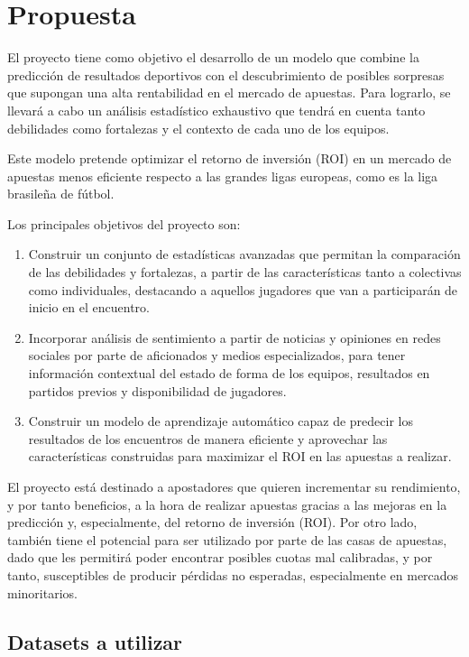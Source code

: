 \section{Propuesta}

El proyecto tiene como objetivo el desarrollo de un modelo que combine la predicción de resultados deportivos con el descubrimiento de posibles sorpresas que supongan una alta rentabilidad en el mercado de apuestas. Para lograrlo, se llevará a cabo un análisis estadístico exhaustivo que tendrá en cuenta tanto debilidades como fortalezas y el contexto de cada uno de los equipos.

Este modelo pretende optimizar el retorno de inversión (ROI) en un mercado de apuestas menos eficiente respecto a las grandes ligas europeas, como es la liga brasileña de fútbol.

Los principales objetivos del proyecto son:

\begin{enumerate}
    \item Construir un conjunto de estadísticas avanzadas que permitan la comparación de las debilidades y fortalezas, a partir de las características tanto a colectivas como individuales, destacando a aquellos jugadores que van a participarán de inicio en el encuentro.
    \item Incorporar análisis de sentimiento a partir de noticias y opiniones en redes sociales por parte de aficionados y medios especializados, para tener información contextual del estado de forma de los equipos, resultados en partidos previos y disponibilidad de jugadores.
    \item Construir un modelo de aprendizaje automático capaz de predecir los resultados de los encuentros de manera eficiente y aprovechar las características construidas para maximizar el ROI en las apuestas a realizar.
\end{enumerate}

El proyecto está destinado a apostadores que quieren incrementar su rendimiento, y por tanto beneficios, a la hora de realizar apuestas gracias a las mejoras en la predicción y, especialmente, del retorno de inversión (ROI). Por otro lado, también tiene el potencial para ser utilizado por parte de las casas de apuestas, dado que les permitirá poder encontrar posibles cuotas mal calibradas, y por tanto, susceptibles de producir pérdidas no esperadas, especialmente en mercados minoritarios.

\subsection{Datasets a utilizar}

